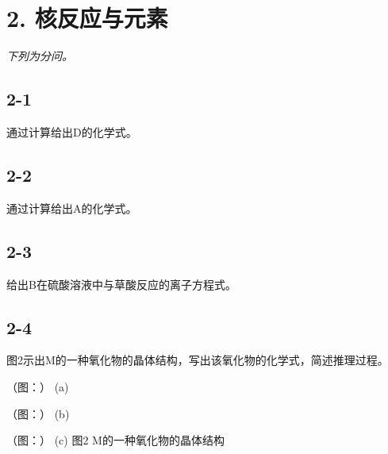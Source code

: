 \section*{2. 核反应与元素}
\textit{下列为分问。}

\subsection*{2-1}
通过计算给出D的化学式。

\subsection*{2-2}
通过计算给出A的化学式。

\subsection*{2-3}
给出B在硫酸溶液中与草酸反应的离⼦⽅程式。

\subsection*{2-4}
图2⽰出M的⼀种氧化物的晶体结构，写出该氧化物的化学式，简述推理过程。

（图：）
(a)

（图：）
(b)

（图：）
(c)
图2 M的⼀种氧化物的晶体结构
